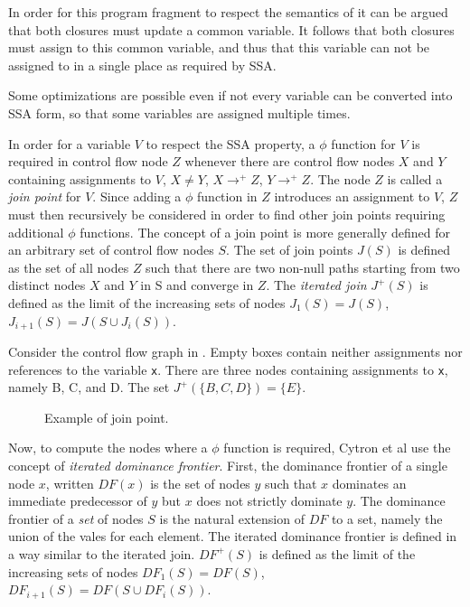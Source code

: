 In order for this program fragment to respect the semantics of \commonlisp{}
it can be argued that both closures must update a common variable.  It
follows that both closures must assign to this common variable, and
thus that this variable can not be assigned to in a single place as
required by SSA. 

Some optimizations are possible even if not every variable can be
converted into SSA form, so that some variables are assigned multiple
times.  

In order for a variable $V$ to respect the SSA property, a $\phi$
function for $V$ is required in control flow node $Z$ whenever there
are control flow nodes $X$ and $Y$ containing assignments to $V$, $X
\ne Y$, $X \rightarrow^+ Z$, $Y \rightarrow^+ Z$.  The node $Z$ is
called a \emph{join point} for $V$.  Since adding a $\phi$ function in
$Z$ introduces an assignment to $V$, $Z$ must then recursively be
considered in order to find other join points requiring additional
$\phi$ functions.  The concept of a join point is more generally
defined for an arbitrary set of control flow nodes $S$.  The set of
join points $J(S)$ is defined as the set of all nodes $Z$ such that
there are two non-null paths starting from two distinct nodes $X$ and
$Y$ in S and converge in $Z$.  The \emph{iterated join} $J^+(S)$ is
defined as the limit of the increasing sets of nodes $J_1(S) = J(S)$,
$J_{i+1}(S) = J(S \cup J_i(S))$.

Consider the control flow graph in .  Empty
boxes contain neither assignments nor references to the variable
\texttt{x}.  There are three nodes containing assignments to
\texttt{x}, namely B, C, and D.  The set $J^+(\{B, C, D\}) = \{E\}$.

\begin{figure}
\begin{center}
\end{center}
\caption{\label{fig-ssa-join-1}
Example of join point.}
\end{figure}

Now, to compute the nodes where a $\phi$ function is required, Cytron
et al use the concept of \emph{iterated dominance frontier}.  First,
the dominance frontier of a single node $x$, written $DF(x)$ is the
set of nodes $y$ such that $x$ dominates an immediate predecessor of
$y$ but $x$ does not strictly dominate $y$.  The dominance frontier of
a \emph{set} of nodes $S$ is the natural extension of $DF$ to a set,
namely the union of the vales for each element.  The iterated
dominance frontier is defined in a way similar to the iterated join. 
$DF^+(S)$ is defined as the limit of the
increasing sets of nodes $DF_1(S) = DF(S)$, $DF_{i+1}(S) = DF(S \cup
DF_i(S))$.

